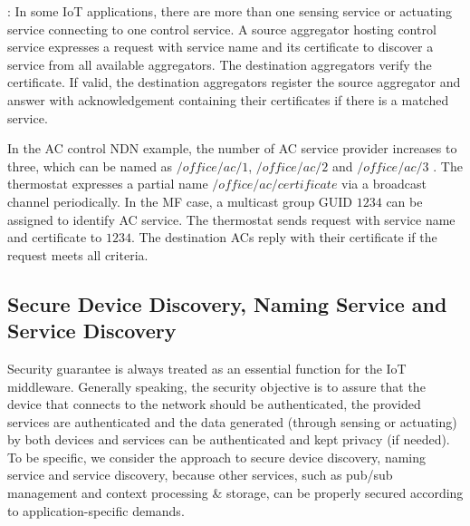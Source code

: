 \vspace{1mm}: In some IoT applications, there are more than one sensing service or actuating service connecting to one control service. A source aggregator hosting control service expresses a request with service name and its certificate to discover a service from all  available aggregators. The destination aggregators verify the certificate. If valid, the destination aggregators register the source aggregator and  answer with acknowledgement containing their certificates if there is a matched service.

In the AC control NDN example, the number of AC service provider increases to three, which can be named as $/office/ac/1$, $/office/ac/2$ and $/office/ac/3$ . The thermostat expresses a partial name $/office/ac/certificate$ via a broadcast channel periodically. In the MF case, a multicast group GUID $1234$ can be assigned to identify AC service. The thermostat sends request with service name and certificate to $1234$. The destination ACs reply with their certificate if the request meets all criteria.

\subsection{Secure Device Discovery, Naming Service and Service Discovery}
Security guarantee is always treated as an essential function for the IoT middleware. Generally speaking, the security objective is to assure that the device that connects to the network should be authenticated, the provided services are authenticated and the data generated (through sensing or actuating) by both devices and services can be authenticated and kept privacy (if needed). To be specific, we consider the approach to secure device discovery, naming service and service discovery, because other services, such as pub/sub management and context processing \& storage, can be properly secured according to application-specific demands.


